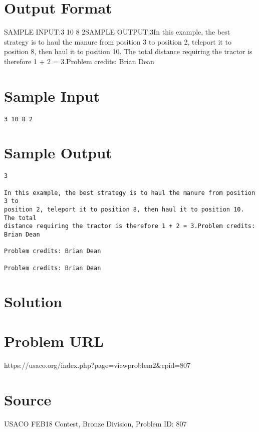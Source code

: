 \documentclass[12pt]{article}
\begin{document}
\section*{Output Format}
SAMPLE INPUT:3 10 8 2SAMPLE OUTPUT:3In this example, the best strategy is to haul the manure from position 3 to
position 2, teleport it to position 8, then haul it to position 10.   The total
distance requiring the tractor is therefore 1 + 2 = 3.Problem credits: Brian Dean

\section*{Sample Input}
\begin{verbatim}
3 10 8 2
\end{verbatim}

\section*{Sample Output}
\begin{verbatim}
3

In this example, the best strategy is to haul the manure from position 3 to
position 2, teleport it to position 8, then haul it to position 10.   The total
distance requiring the tractor is therefore 1 + 2 = 3.Problem credits: Brian Dean

Problem credits: Brian Dean

Problem credits: Brian Dean
\end{verbatim}

\section*{Solution}


\section*{Problem URL}
https://usaco.org/index.php?page=viewproblem2&cpid=807

\section*{Source}
USACO FEB18 Contest, Bronze Division, Problem ID: 807
\end{document}
